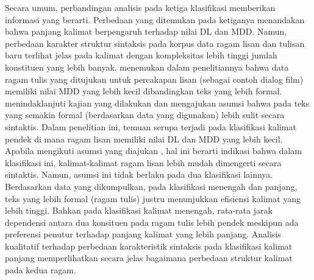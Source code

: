 Secara umum, perbandingan analisis pada ketiga klasifikasi memberikan informasi yang berarti. Perbedaan yang ditemukan pada ketiganya menandakan bahwa panjang kalimat berpengaruh terhadap nilai DL dan MDD. Namun, perbedaan karakter struktur sintaksis pada korpus data ragam lisan dan tulisan baru terlihat jelas pada kalimat dengan kompleksitas lebih tinggi jumlah konstituen yang lebih banyak. \cite{wang2017effects} menemukan dalam penelitiannya bahwa data ragam tulis yang ditujukan untuk percakapan lisan (sebagai contoh dialog film) memiliki nilai MDD yang lebih kecil dibandingkan teks yang lebih formal. \cite{wang2017effects} menindaklanjuti kajian yang dilakukan \cite{hiranuma1999syntactic} dan \cite{liu2009chinese} mengajukan asumsi bahwa pada teks yang semakin formal (berdasarkan data yang digunakan) lebih sulit secara sintaktis. Dalam penelitian ini, temuan serupa terjadi pada klasifikasi kalimat pendek di mana ragam lisan memiliki nilai DL dan MDD yang lebih kecil. Apabila mengikuti asumsi yang diajukan \cite{wang2017effects}, hal ini berarti indikasi bahwa dalam klasifikasi ini, kalimat-kalimat ragam lisan lebih mudah dimengerti secara sintaktis. Namun, asumsi ini tidak berlaku pada dua klasifikasi lainnya. Berdasarkan data yang dikumpulkan, pada klasifikasi menengah dan panjang, teks yang lebih formal (ragam tulis) justru menunjukkan efisiensi kalimat yang lebih tinggi. Bahkan pada klasifikasi kalimat menengah, rata-rata jarak dependensi antara dua konsituen pada ragam tulis lebih pendek meskipun ada preferensi penutur terhadap panjang kalimat yang lebih panjang. Analisis kualitatif terhadap perbedaan karakteristik sintaksis pada klasifikasi kalimat panjang memperlihatkan secara jelas bagaimana perbedaan struktur kalimat pada kedua ragam. 

